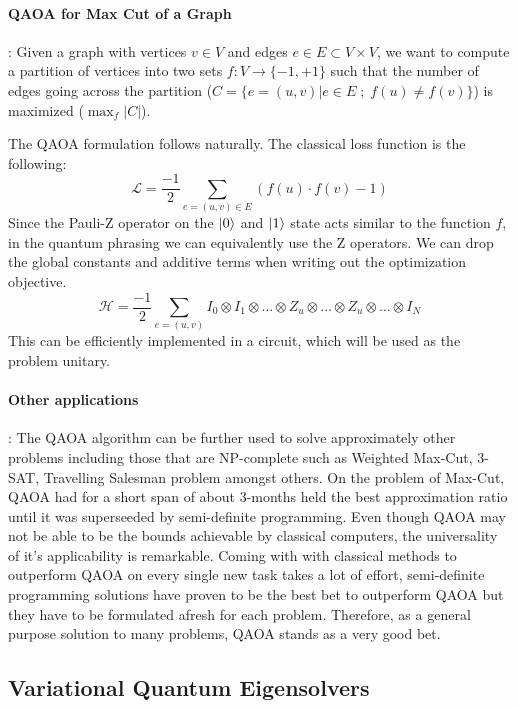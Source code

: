\paragraph*{QAOA for Max Cut of a Graph}: Given a graph with vertices $v \in V$ and edges $e \in E \subset V \times V$, we want to compute a partition of vertices into two sets $f: V \rightarrow \{-1, +1\}$ such that the number of edges going across the partition ($C = \{ e = (u, v) | e \in E \;;\; f(u) \neq f(v) \}$) is maximized ($\max_{f} |C|$).

The QAOA formulation follows naturally. The classical loss function is the following:
\begin{equation}
    \mathcal{L} = \frac{-1}{2} \sum_{e = (u, v) \in E} (f(u) \cdot f(v) - 1)
\end{equation}
Since the Pauli-Z operator on the $\ket{0}$ and $\ket{1}$ state acts similar to the function $f$, in the quantum phrasing we can equivalently use the Z operators. We can drop the global constants and additive terms when writing out the optimization objective.
\begin{equation}
    \mathcal{H} = \frac{-1}{2} \sum_{e = (u, v)} I_0 \otimes I_1 \otimes \ldots \otimes Z_u \otimes \ldots \otimes Z_u \otimes \ldots \otimes I_N
\end{equation}
This can be efficiently implemented in a circuit, which will be used as the problem unitary.

\paragraph*{Other applications}: The QAOA algorithm can be further used to solve approximately other problems including those that are NP-complete such as Weighted Max-Cut, 3-SAT, Travelling Salesman problem amongst others. On the problem of Max-Cut, QAOA had for a short span of about 3-months held the best approximation ratio until it was superseeded by semi-definite programming. Even though QAOA may not be able to be the bounds achievable by classical computers, the universality of it's applicability is remarkable. Coming with with classical methods to outperform QAOA on every single new task takes a lot of effort, semi-definite programming solutions have proven to be the best bet to outperform QAOA but they have to be formulated afresh for each problem. Therefore, as a general purpose solution to many problems, QAOA stands as a very good bet.


\subsection{Variational Quantum Eigensolvers}

